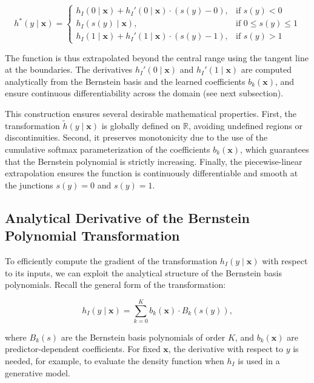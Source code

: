 \begin{equation}
h^*(y \mid \mathbf{x}) =
\begin{cases}
h_I(0 \mid \mathbf{x}) + h_I'(0 \mid \mathbf{x}) \cdot (s(y) - 0), & \text{if } s(y) < 0 \\
h_I(s(y) \mid \mathbf{x}), & \text{if } 0 \leq s(y) \leq 1 \\
h_I(1 \mid \mathbf{x}) + h_I'(1 \mid \mathbf{x}) \cdot (s(y) - 1), & \text{if } s(y) > 1
\end{cases}
\label{eq:extended_bernstein}
\end{equation}

The function is thus extrapolated beyond the central range using the tangent line at the boundaries. The derivatives \( h_I'(0 \mid \mathbf{x}) \) and \( h_I'(1 \mid \mathbf{x}) \) are computed analytically from the Bernstein basis and the learned coefficients \( b_k(\mathbf{x}) \), and ensure continuous differentiability across the domain (see next subsection).


This construction ensures several desirable mathematical properties. First, the transformation \( \tilde{h}(y \mid \mathbf{x}) \) is globally defined on \( \mathbb{R} \), avoiding undefined regions or discontinuities. Second, it preserves monotonicity due to the use of the cumulative softmax parameterization of the coefficients \( b_k(\mathbf{x}) \), which guarantees that the Bernstein polynomial is strictly increasing. Finally, the piecewise-linear extrapolation ensures the function is continuously differentiable and smooth at the junctions \( s(y) = 0 \) and \( s(y) = 1 \).




\subsection{Analytical Derivative of the Bernstein Polynomial Transformation}

To efficiently compute the gradient of the transformation \( h_I(y \mid \mathbf{x}) \) with respect to its inputs, we can exploit the analytical structure of the Bernstein basis polynomials. Recall the general form of the transformation:

\begin{equation}
h_I(y \mid \mathbf{x}) = \sum_{k=0}^{K} b_k(\mathbf{x}) \cdot B_k(s(y)),
\end{equation}

where \( B_k(s) \) are the Bernstein basis polynomials of order \( K \), and \( b_k(\mathbf{x}) \) are predictor-dependent coefficients. For fixed \( \mathbf{x} \), the derivative with respect to \( y \) is needed, for example, to evaluate the density function when \( h_I \) is used in a generative model.

